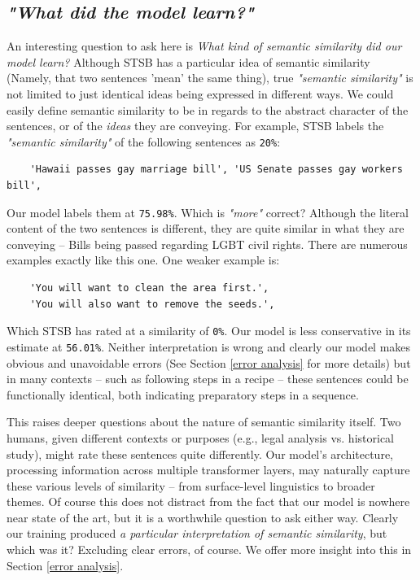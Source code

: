 \documentclass{article}
\begin{document}
\subsection{\textit{"What did the model learn?"}}
An interesting question to ask here is \textit{What kind of semantic similarity did our model learn?} Although STSB has a particular idea of semantic similarity (Namely, that two sentences 'mean' the same thing), true \textit{"semantic similarity"} is not limited to just identical ideas being expressed in different ways. We could easily define semantic similarity to be in regards to the abstract character of the sentences, or of the \textit{ideas} they are conveying. For example, STSB labels the \textit{"semantic similarity"} of the following sentences as \verb|20%|:
\begin{verbatim}
    'Hawaii passes gay marriage bill', 'US Senate passes gay workers bill',
\end{verbatim}
Our model labels them at \verb|75.98%|. Which is \textit{"more"} correct? Although the literal content of the two sentences is different, they are quite similar in what they are conveying -- Bills being passed regarding LGBT civil rights. There are numerous examples exactly like this one. One weaker example is:
\begin{verbatim}
    'You will want to clean the area first.',
    'You will also want to remove the seeds.',
\end{verbatim}
Which STSB has rated at a similarity of \verb|0%|. Our model is less conservative in its estimate at \verb|56.01%|. Neither interpretation is wrong and clearly our model makes obvious and unavoidable errors (See Section \ref{error analysis} for more details) but in many contexts -- such as following steps in a recipe -- these sentences could be functionally identical, both indicating preparatory steps in a sequence.

This raises deeper questions about the nature of semantic similarity itself. Two humans, given different contexts or purposes (e.g., legal analysis vs. historical study), might rate these sentences quite differently. Our model's architecture, processing information across multiple transformer layers, may naturally capture these various levels of similarity -- from surface-level linguistics to broader themes. Of course this does not distract from the fact that our model is nowhere near state of the art, but it is a worthwhile question to ask either way. Clearly our training produced \textit{a particular interpretation of semantic similarity}, but which was it? Excluding clear errors, of course. We offer more insight into this in Section \ref{error analysis}.
\end{document}
